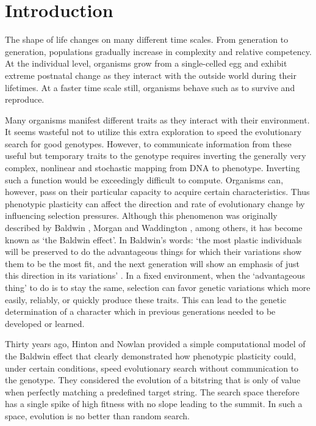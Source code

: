 \section{Introduction}
\label{sec:intro}


The shape of life changes on many different time scales.
From generation to generation, populations gradually increase in complexity and relative competency.
At the individual level, organisms grow from a single-celled egg and exhibit extreme postnatal change as they interact with the outside world during their lifetimes.
At a faster time scale still, organisms behave such as to survive and reproduce.

Many organisms manifest different traits as they interact with their environment.
It seems wasteful not to utilize this extra exploration to speed the evolutionary search for good genotypes. 
However, to communicate information from these useful but temporary traits to the genotype requires inverting the generally very complex, nonlinear and stochastic mapping from DNA to phenotype.
Inverting such a function would be exceedingly difficult to compute.
Organisms can, however,
pass on their particular capacity to acquire certain characteristics. 
Thus phenotypic plasticity can affect the direction and rate of evolutionary change by influencing selection pressures.
Although this phenomenon was originally described by Baldwin \cite{baldwin1896new}, Morgan \cite{morgan1896modification} and Waddington \cite{waddington1942canalization}, among others, it has become known as `the Baldwin effect'.
In Baldwin's words:
`the most plastic individuals will be preserved to do the advantageous things for which their variations show them to be the most fit, and the next generation will show an emphasis of just this direction in its variations' \cite{baldwin1896new}.
In a fixed environment, when the `advantageous thing' to do is to stay the same, selection can favor genetic variations which more easily, reliably, or quickly produce these traits. 
This can lead to the genetic determination of a character which in previous generations needed to be developed or learned.


Thirty years ago, Hinton and Nowlan \cite{hinton1987learning} provided a simple computational model of the Baldwin effect that clearly demonstrated how phenotypic plasticity could, under certain conditions, speed evolutionary search without communication to the genotype.
They considered the evolution of a bitstring that is only of value when perfectly matching a predefined target string.
The search space therefore has a single spike of high fitness with no slope leading to the summit.
In such a space, evolution is no better than random search.

